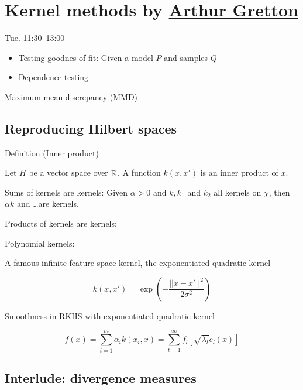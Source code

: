 \chapter{Kernel methods by \href{http://www.gatsby.ucl.ac.uk/~gretton/}{Arthur Gretton}}

 Tue. 11:30--13:00

\begin{itemize}
  \item Testing goodnes of fit: Given a model $P$ and samples $Q$
  \item Dependence testing
\end{itemize}

Maximum mean discrepancy (MMD)

\section{Reproducing Hilbert spaces}

Definition (Inner product)

Let $H$ be a vector space over $\operatorname*{\mathbb{\mathop{R}}}$. A function $k(x,x')$ is an inner
product of $x$.

\begin{theorem}
  Sums of kernels are kernels: Given $\alpha > 0$ and $k, k_1$ and $k_2$ all
  kernels on $\chi$, then $\alpha k$ and \dots are kernels.
\end{theorem}

\begin{theorem}
  Products of kernels are kernels:
\end{theorem}

\begin{theorem}
  Polynomial kernels:
\end{theorem}

A famous infinite feature space kernel, the exponentiated quadratic kernel

\begin{equation}
  k(x, x') = \exp\left(-\frac{||x-x'||^2}{2\sigma^2}\right)
\end{equation}

Smoothness in RKHS with exponentiated quadratic kernel

\begin{equation}
  f(x) = \sum_{i=1}^m \alpha_i k(x_i, x) = \sum_{t=1}^\infty f_l [\sqrt{\lambda_l}e_l(x)]
\end{equation}

\section{Interlude: divergence measures}

